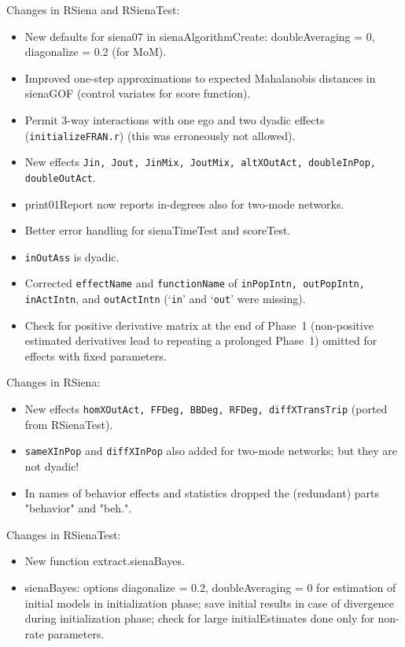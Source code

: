 \documentclass[a4paper,fleqn,11pt]{article}
\newcommand{\+}{\, + \,}
\newcommand{\sfn}[1]{\textsf{#1}}
\begin{document}
\begin{small}
\begin{itemize}
Changes in \textsf{RSiena} and \textsf{RSienaTest}:
\begin{itemize}
   \item New defaults for \sfn{siena07} in \sfn{sienaAlgorithmCreate}:
     doubleAveraging = 0, diagonalize = 0.2 (for MoM).
   \item Improved one-step approximations to expected Mahalanobis
     distances in \sfn{sienaGOF} (control variates for score function).
   \item Permit 3-way interactions with one ego and two dyadic effects
     (\texttt{initializeFRAN.r}) (this was erroneously not allowed).
   \item New effects \texttt{Jin, Jout, JinMix, JoutMix, altXOutAct,
     doubleInPop, doubleOutAct}.
   \item \sfn{print01Report} now reports in-degrees also for two-mode networks.
   \item Better error handling for \textsf{sienaTimeTest} and \sfn{scoreTest}.
   \item \texttt{inOutAss} is dyadic.
   \item Corrected \texttt{effectName} and \texttt{functionName} of \texttt{inPopIntn, outPopIntn,
     inActIntn}, and \texttt{outActIntn} (`\texttt{in}' and `\texttt{out}' were missing).
  \item Check for positive derivative matrix at the end of Phase~1 (non-positive
     estimated derivatives lead to repeating a prolonged Phase~1)
     omitted for effects with fixed parameters.
\end{itemize}

Changes in RSiena:
\begin{itemize}
   \item New effects \texttt{homXOutAct, FFDeg, BBDeg, RFDeg, diffXTransTrip}
     (ported from \textsf{RSienaTest}).
   \item \texttt{sameXInPop} and \texttt{diffXInPop} also added for two-mode networks;
     but they are not dyadic!
   \item In names of behavior effects and statistics dropped the
     (redundant) parts "behavior" and "beh.".
\end{itemize}

Changes in \textsf{RSienaTest}:
\begin{itemize}
   \item New function \sfn{extract.sienaBayes}.
   \item \sfn{sienaBayes}: options diagonalize = 0.2, doubleAveraging = 0 for estimation
     of initial models in initialization phase; save initial results in case of
     divergence during initialization phase;
     check for large initialEstimates done only for non-rate parameters.
\end{itemize}


\end{itemize}
\end{small}
\end{document}
